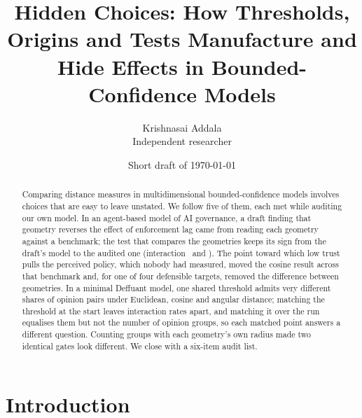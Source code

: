 \documentclass[11pt]{article}
\title{Hidden Choices: How Thresholds, Origins and Tests Manufacture and Hide Effects in Bounded-Confidence Models}
\author{Krishnasai Addala\\ \small Independent researcher}
\date{Short draft of \today}
\begin{document}
\maketitle

\begin{abstract}
Comparing distance measures in multidimensional bounded-confidence models involves choices that are easy to leave unstated.
We follow five of them, each met while auditing our own model.
In an agent-based model of AI governance, a draft finding that geometry reverses the effect of enforcement lag came from reading each geometry against a benchmark; the test that compares the geometries keeps its sign from the draft's model to the audited one (interaction \VCDraftInter\ and \VCRecommendedInter).
The point toward which low trust pulls the perceived policy, which nobody had measured, moved the cosine result across that benchmark and, for one of four defensible targets, removed the difference between geometries.
In a minimal Deffuant model, one shared threshold admits very different shares of opinion pairs under Euclidean, cosine and angular distance; matching the threshold at the start leaves interaction rates apart, and matching it over the run equalises them but not the number of opinion groups, so each matched point answers a different question.
Counting groups with each geometry's own radius made two identical gates look different.
We close with a six-item audit list.
\end{abstract}

\section{Introduction}
\end{document}
